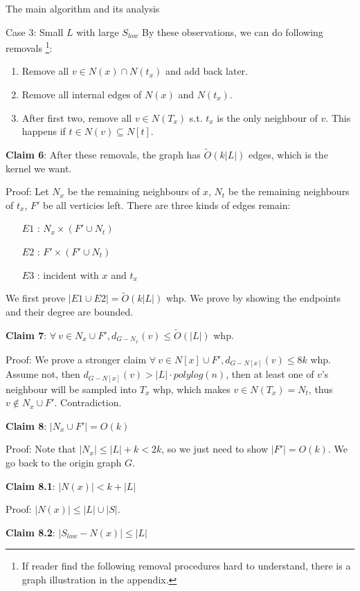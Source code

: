 \documentclass{article}
\begin{document}
\begin{section}{The main algorithm and its analysis}
\begin{subsection}{Case 3: Small $L$ with large $S_{low}$}
    By these observations, we can do following removals \footnote{If reader find the following removal procedures hard to understand, there is a graph illustration in the appendix.}:
    \begin{enumerate}
      \item Remove all $v \in N(x) \cap N(t_x)$ and add back later. 
      \item Remove all internal edges of $N(x)$ and $N(t_x)$. 
      \item After first two, remove all $v \in N(T_x)$ s.t. $t_x$ is the only neighbour of $v$. This happens if $t \in N(v) \subseteq N[t]$. 
    \end{enumerate}

    \textbf{Claim 6}: After these removals, the graph has $\tilde{O}(k|L|)$ edges, which is the kernel we want.

    Proof: Let $N_x$ be the remaining neighbours of $x$, $N_t$ be the remaining neighbours of $t_x$, $F'$ be all verticies left. There are three kinds of edges remain:
    \begin{enumerate}
      \item [$E1$]: $N_x \times (F' \cup N_t)$ 
      \item [$E2$]: $F' \times (F' \cup N_t)$
      \item [$E3$]: incident with $x$ and $t_x$
    \end{enumerate}
    We first prove $|E1 \cup E2| = \tilde{O}(k|L|)$ whp. We prove by showing the endpoints and their degree are bounded. 

    \textbf{Claim 7}: $\forall \ v \in N_x \cup F', d_{G - N_x} (v) \leq \tilde{O}(|L|)$ whp. 

    Proof: We prove a stronger claim $\forall \ v \in N[x] \cup F', d_{G - N[x]} (v) \leq 8k$ whp. Assume not, then $d_{G - N[x]} (v) > |L| \cdot polylog(n)$, then at least one of $v$'s neighbour will be sampled into $T_x$ whp, which makes $v \in N(T_x) = N_t$, thus $v \notin N_x \cup F'$. Contradiction. 

    \textbf{Claim 8}: $|N_x \cup F'| = O(k)$ 

    Proof: Note that $|N_x| \leq |L| + k < 2k$, so we just need to show $|F'| = O(k)$. We go back to the origin graph $G$. 

    \textbf{Claim 8.1}: $|N(x)| < k + |L|$

    Proof: $|N(x)| \leq |L| \cup |S|$. 

    \textbf{Claim 8.2}: $|S_{low} - N(x)| \leq |L|$


\end{subsection}
\end{section}
\end{document}
